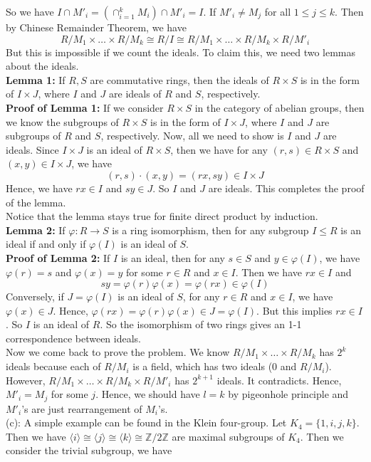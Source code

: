 \documentclass[12pt]{amsart}
\newcommand{\Z}{\mathbb{Z}}
\begin{document}
So we have $I\cap M'_i=(\cap_{i=1}^k M_i)\cap M'_i=I$. If $M'_i\neq M_j$ for all $1\leq j\leq k$. Then by Chinese Remainder Theorem, we have
\[R/M_1\times \dots \times R/M_k\cong R/I\cong R/M_1\times \dots \times R/M_k\times R/M'_i\]
But this is impossible if we count the ideals. To claim this, we need two lemmas about the ideals.\\
\textbf{Lemma 1:} If $R,S$ are commutative rings, then the ideals of $R\times S$ is in the form of $I\times J$, where $I$ and $J$ are ideals of $R$ and $S$, respectively.\\
\textbf{Proof of Lemma 1:} If we consider $R\times S$ in the category of abelian groups, then we know the subgroups of $R\times S$ is in the form of $I\times J$, where $I$ and $J$ are subgroups of $R$ and $S$, respectively. Now, all we need to show is $I$ and $J$ are ideals. Since $I\times J$ is an ideal of $R\times S$, then we have for any $(r,s)\in R\times S$ and $(x,y)\in I\times J$, we have 
\[(r,s)\cdot (x,y)=(rx,sy)\in I\times J\]
Hence, we have $rx\in I$ and $sy\in J$. So $I$ and $J$ are ideals. This completes the proof of the lemma.\\
Notice that the lemma stays true for finite direct product by induction.\\
\textbf{Lemma 2:} If $\varphi: R\to S$ is a ring isomorphism, then for any subgroup $I\leq R$ is an ideal if and only if $\varphi(I)$ is an ideal of $S$.\\
\textbf{Proof of Lemma 2:} If $I$ is an ideal, then for any $s\in S$ and $y\in \varphi(I)$, we have $\varphi(r)=s$ and $\varphi(x)=y$ for some $r\in R$ and $x\in I$. Then we have $rx\in I$ and
\[sy=\varphi(r)\varphi(x)=\varphi(rx)\in \varphi(I)\]
Conversely, if $J=\varphi(I)$ is an ideal of $S$, for any $r\in R$ and $x\in I$, we have $\varphi(x)\in J$. Hence, $\varphi(rx)=\varphi(r)\varphi(x)\in J=\varphi(I)$. But this implies $rx\in I$. So $I$ is an ideal of $R$. So the isomorphism of two rings gives an 1-1 correspondence between ideals.\\
Now we come back to prove the problem. We know $ R/M_1\times \dots \times R/M_k$ has $2^k$ ideals because each of $R/M_i$ is a field, which has two ideals ($0$ and $R/M_i$). However, $ R/M_1\times \dots \times R/M_k\times R/M'_i$ has $2^{k+1}$ ideals. It contradicts. Hence, $M'_i=M_j$ for some $j$. Hence, we should have $l=k$ by pigeonhole principle and $M'_i$'s are just rearrangement of $M_i$'s.  
\\(c): A simple example can be found in the Klein four-group. Let $K_4=\{1,i,j,k\}$. Then we have $\langle i\rangle\cong \langle j\rangle\cong\langle k\rangle\cong \Z/2\Z$ are maximal subgroups of $K_4$. Then we consider the trivial subgroup, we have 
\end{document}
